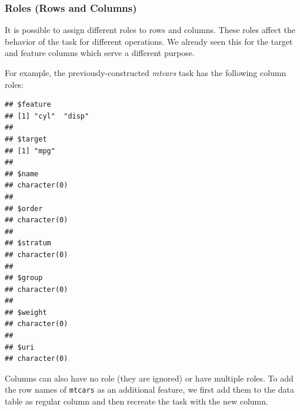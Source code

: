 \documentclass[
]{scrbook}
\newenvironment{Shaded}{\begin{snugshade}}{\end{snugshade}}
\newcommand{\AttributeTok}[1]{\textcolor[rgb]{0.77,0.63,0.00}{#1}}
\newcommand{\CommentTok}[1]{\textcolor[rgb]{0.56,0.35,0.01}{\textit{#1}}}
\newcommand{\ConstantTok}[1]{\textcolor[rgb]{0.00,0.00,0.00}{#1}}
\newcommand{\DecValTok}[1]{\textcolor[rgb]{0.00,0.00,0.81}{#1}}
\newcommand{\FunctionTok}[1]{\textcolor[rgb]{0.00,0.00,0.00}{#1}}
\newcommand{\NormalTok}[1]{#1}
\newcommand{\OtherTok}[1]{\textcolor[rgb]{0.56,0.35,0.01}{#1}}
\newcommand{\SpecialCharTok}[1]{\textcolor[rgb]{0.00,0.00,0.00}{#1}}
\newcommand{\StringTok}[1]{\textcolor[rgb]{0.31,0.60,0.02}{#1}}
\renewenvironment{Shaded} {\begin{snugshade}\small} {\end{snugshade}}
\begin{document}
\hypertarget{tasks-roles}{%
\subsubsection{Roles (Rows and Columns)}\label{tasks-roles}}

It is possible to assign different roles to rows and columns.
These roles affect the behavior of the task for different operations.
We already seen this for the target and feature columns which serve a different purpose.

For example, the previously-constructed \emph{mtcars} task has the following column roles:

\begin{Shaded}
\end{Shaded}

\begin{verbatim}
## $feature
## [1] "cyl"  "disp"
## 
## $target
## [1] "mpg"
## 
## $name
## character(0)
## 
## $order
## character(0)
## 
## $stratum
## character(0)
## 
## $group
## character(0)
## 
## $weight
## character(0)
## 
## $uri
## character(0)
\end{verbatim}

Columns can also have no role (they are ignored) or have multiple roles.
To add the row names of \texttt{mtcars} as an additional feature, we first add them to the data table as regular column and then recreate the task with the new column.

\begin{Shaded}
\end{Shaded}
\end{document}
